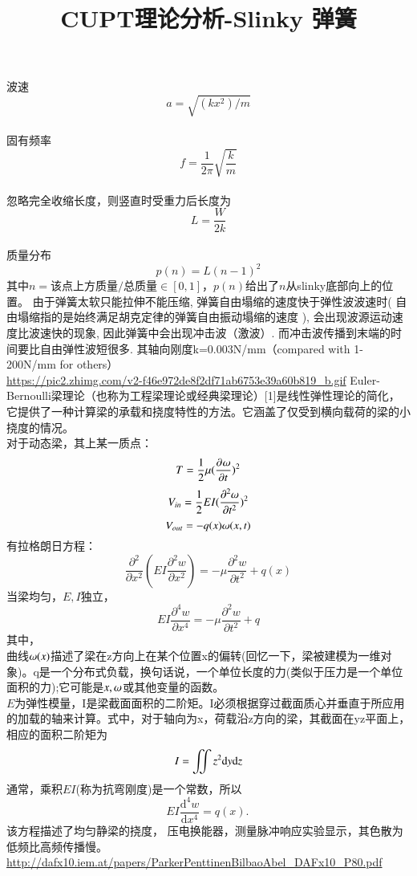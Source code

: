 \documentclass[UTF8,9pt]{ctexart}
\title{CUPT理论分析-Slinky 弹簧}
\begin{document}
 
\maketitle
{}
    波速$$a=\sqrt{(kx^2)/m}$$\\
    固有频率$$f=\frac{1}{2\pi}\sqrt{\frac{k}{m}}$$\\
    忽略完全收缩长度，则竖直时受重力后长度为$$L=\frac{W}{2k}$$\\
    质量分布
    $$p(n)=L(n-1)^2$$
    其中$n=\text{该点上方质量/总质量}  \in [0,1]$，$p(n)$给出了$n$从slinky底部向上的位置。
    由于弹簧太软只能拉伸不能压缩, 弹簧自由塌缩的速度快于弹性波波速时( 自由塌缩指的是始终满足胡克定律的弹簧自由振动塌缩的速度 ), 会出现波源运动速度比波速快的现象, 因此弹簧中会出现冲击波（激波）. 而冲击波传播到末端的时间要比自由弹性波短很多.
    其轴向刚度k=0.003N/mm（compared with 1-200N/mm for others）\\
    \url{https://pic2.zhimg.com/v2-f46e972de8f2df71ab6753e39a60b819_b.gif}
Euler-Bernoulli梁理论（也称为工程梁理论或经典梁理论）[1]是线性弹性理论的简化，它提供了一种计算梁的承载和挠度特性的方法。它涵盖了仅受到横向载荷的梁的小挠度的情况。\\
对于动态梁，其上某一质点：\\
$$T=\ff{2}\mu (\pt {\o} )^2$$
$$V_{in}=\ff{2}EI(\pt[2]{\o})^2$$
$$V_{out}=-q(x)\o(x,t)$$
有拉格朗日方程：
$$\frac { \partial ^ { 2 } } { \partial x ^ { 2 } }( E I \frac { \partial ^ { 2 } w } { \partial x ^ { 2 } }) = - \mu \frac { \partial ^ { 2 } w } { \partial t ^ { 2 } } + q ( x )$$
当梁均匀，$E,I$独立，
$$E I \frac { \partial ^ { 4 } w } { \partial x ^ { 4 } } = - \mu \frac { \partial ^ { 2 } w } { \partial t ^ { 2 } } + q$$
其中，\\
曲线$\o(x)$描述了梁在z方向上在某个位置x的偏转(回忆一下，梁被建模为一维对象)。q是一个分布式负载，换句话说，一个单位长度的力(类似于压力是一个单位面积的力);它可能是$x,\o$或其他变量的函数。\\
$E$为弹性模量，I是梁截面面积的二阶矩。I必须根据穿过截面质心并垂直于所应用的加载的轴来计算。式中，对于轴向为x，荷载沿z方向的梁，其截面在yz平面上，相应的面积二阶矩为$$I=\iint z^{2}\d y\d z$$
通常，乘积$EI$(称为抗弯刚度)是一个常数，所以
$$EI{\frac  {{\mathrm  {d}}^{4}w}{{\mathrm  {d}}x^{4}}}=q(x).\,$$
该方程描述了均匀静梁的挠度，
压电换能器，测量脉冲响应实验显示，其色散为低频比高频传播慢。\\
\url{http://dafx10.iem.at/papers/ParkerPenttinenBilbaoAbel_DAFx10_P80.pdf}\\
\end{document}
